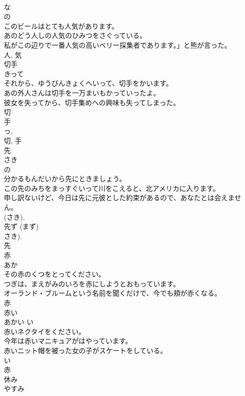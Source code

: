 \documentclass[8pt]{extreport}
\begin{document}
\begin{CJK}{UTF8}{min}
\\	な 
\\	の 
\\	このビールはとても人気があります。	
\\	あのどう人しの人気のひみつをさぐっている。	
\\	私がこの辺りで一番人気の高いベリー採集者であります。」と熊が言った。	
\\	人, 気	
\\	切手	
\\	きって	
\\	それから、ゆうびんきょくへいって、切手をかいます。	
\\	あの外人さんは切手を一万まいもかっていったよ。	
\\	彼女を失ってから、切手集めへの興味も失ってしまった。	
\\	切 
\\	手 
\\	っ, 
\\	切, 手	
\\	先	
\\	さき	
\\	の 
\\	分かるもんだいから先にときましょう。	
\\	この先のみちをまっすぐいって川をこえると、北アメリカに入ります。	
\\	申し訳ないけど、今日は先に元彼とした約束があるので、あなたとは会えません。	
\\	(さき). 
\\	先ず (まず) 
\\	さき).
\\	先	
\\	赤	
\\	あか	
\\	その赤のくつをとってください。	
\\	つぎは、まえがみのいろを赤にしようとおもっています。	
\\	オーランド・ブルームという名前を聞くだけで、今でも頬が赤くなる。	
\\	赤	
\\	赤い	
\\	あかい	い 
\\	赤いネクタイをください。	
\\	今年は赤いマニキュアがはやっています。	
\\	赤いニット帽を被った女の子がスケートをしている。	
\\	い 
\\	赤	
\\	休み	
\\	やすみ	

\end{CJK}
\end{document}
